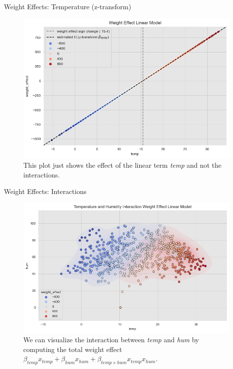 \documentclass[10pt]{beamer}
\begin{document}
\begin{frame}{Weight Effects: Temperature (z-transform)}
\begin{center}
  \begin{figure}
    \includegraphics[scale=0.48]{images/interpretable_ml_67_0.png}
    \caption{This plot just shows the effect of the linear term {\em temp} and not the interactions.}
  \end{figure}
\end{center}
\end{frame}

\begin{frame}{Weight Effects: Interactions}
\begin{center}
  \begin{figure}
    \includegraphics[scale=0.48]{images/interpretable_ml_70_0.png}
    \caption{
      We can visualize the interaction between {\em temp} and {\em hum} by computing the total weight effect $\beta_{temp}x_{temp} + \beta_{hum}x_{hum} + \beta_{temp \times hum}x_{temp}x_{hum}$.
    }
  \end{figure}
\end{center}
\end{frame}
\end{document}
